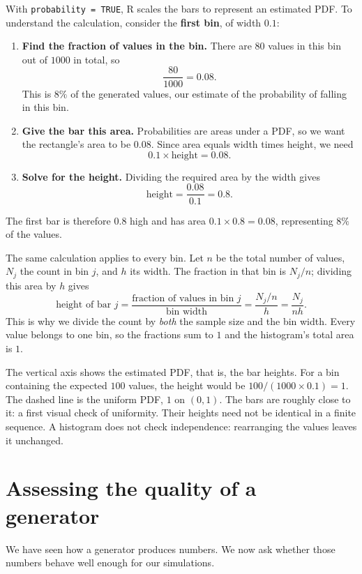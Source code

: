 \documentclass[a4paper,12pt,oneside]{report}
\begin{document}
With \texttt{probability = TRUE}, R scales the bars to represent
an estimated PDF. To understand the calculation, consider the
\textbf{first bin}, of width $0.1$:
\begin{enumerate}
  \item \textbf{Find the fraction of values in the bin.}
  There are $80$ values in this bin out of $1000$ in total, so
  \[
    \frac{80}{1000}=0.08.
  \]
  This is $8\%$ of the generated values, our estimate of the
  probability of falling in this bin.

  \item \textbf{Give the bar this area.}
  Probabilities are areas under a PDF, so we want the rectangle's
  area to be $0.08$. Since area equals width times height, we need
  \[
    0.1\times\text{height}=0.08.
  \]

  \item \textbf{Solve for the height.}
  Dividing the required area by the width gives
  \[
    \text{height}=\frac{0.08}{0.1}=0.8.
  \]
\end{enumerate}
The first bar is therefore $0.8$ high and has area
$0.1\times0.8=0.08$, representing $8\%$ of the values.

The same calculation applies to every bin. Let $n$ be the total
number of values, $N_j$ the count in bin $j$, and $h$ its width.
The fraction in that bin is $N_j/n$; dividing this area by $h$ gives
\[
  \text{height of bar }j
  =\frac{\text{fraction of values in bin }j}{\text{bin width}}
  =\frac{N_j/n}{h}=\frac{N_j}{nh}.
\]
This is why we divide the count by \emph{both} the sample size and
the bin width. Every value belongs to one bin, so the fractions
sum to $1$ and the histogram's total area is $1$.

The vertical axis shows the estimated PDF, that is, the bar heights.
For a bin containing the expected $100$ values, the height would be
$100/(1000\times0.1)=1$. The dashed line is the uniform PDF,
$1$ on $(0,1)$. The bars
are roughly close to it: a first visual check of uniformity.
Their heights need not be identical in a finite sequence.
A histogram does not check independence: rearranging the values
leaves it unchanged.

\section{Assessing the quality of a generator}
\label{sec:prng-quality}
We have seen how a generator produces numbers. We now ask whether
those numbers behave well enough for our simulations.
\end{document}
